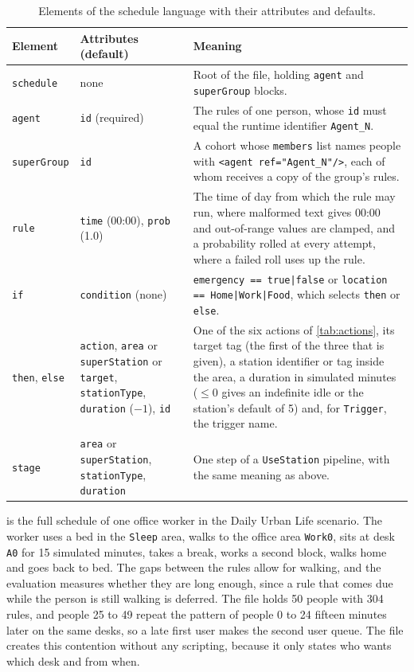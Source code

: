 \begin{table}[H]
\centering
\small\renewcommand{\arraystretch}{1.15}
\begin{tabularx}{\textwidth}{|L{2.3cm}|L{4.4cm}|>{\raggedright\arraybackslash}X|}
\hline
{}\textbf{Element} & \textbf{Attributes (default)} & \textbf{Meaning} \\
\hline
\texttt{schedule} & none & Root of the file, holding \texttt{agent} and \texttt{superGroup} blocks. \\ \hline
\texttt{agent} & \texttt{id} (required) & The rules of one person, whose \texttt{id} must equal the runtime identifier \texttt{Agent\_N}. \\ \hline
\texttt{superGroup} & \texttt{id} & A cohort whose \texttt{members} list names people with \texttt{<agent ref="Agent\_N"/>}, each of whom receives a copy of the group's rules. \\ \hline
\texttt{rule} & \texttt{time} (00:00), \texttt{prob} (1.0) & The time of day from which the rule may run, where malformed text gives 00:00 and out-of-range values are clamped, and a probability rolled at every attempt, where a failed roll uses up the rule. \\ \hline
\texttt{if} & \texttt{condition} (none) & \texttt{emergency == true|false} or \texttt{location == Home|Work|Food}, which selects \texttt{then} or \texttt{else}. \\ \hline
\texttt{then}, \texttt{else} & \texttt{action}, \texttt{area} or \texttt{superStation} or \texttt{target}, \texttt{stationType}, \texttt{duration} ($-1$), \texttt{id} & One of the six actions of \cref{tab:actions}, its target tag (the first of the three that is given), a station identifier or tag inside the area, a duration in simulated minutes ($\le 0$ gives an indefinite idle or the station's default of 5) and, for \texttt{Trigger}, the trigger name. \\ \hline
\texttt{stage} & \texttt{area} or \texttt{superStation}, \texttt{stationType}, \texttt{duration} & One step of a \texttt{UseStation} pipeline, with the same meaning as above. \\ \hline
\end{tabularx}
\caption[Elements of the schedule language]{Elements of the schedule language with their attributes and defaults.}
\label{tab:grammar}
\end{table}

 is the full schedule of one office worker in the Daily Urban Life scenario. The worker uses a bed in the \texttt{Sleep} area, walks to the office area \texttt{Work0}, sits at desk \texttt{A0} for 15 simulated minutes, takes a break, works a second block, walks home and goes back to bed. The gaps between the rules allow for walking, and the evaluation measures whether they are long enough, since a rule that comes due while the person is still walking is deferred. The file holds 50 people with 304 rules, and people 25 to 49 repeat the pattern of people 0 to 24 fifteen minutes later on the same desks, so a late first user makes the second user queue. The file creates this contention without any scripting, because it only states who wants which desk and from when.

